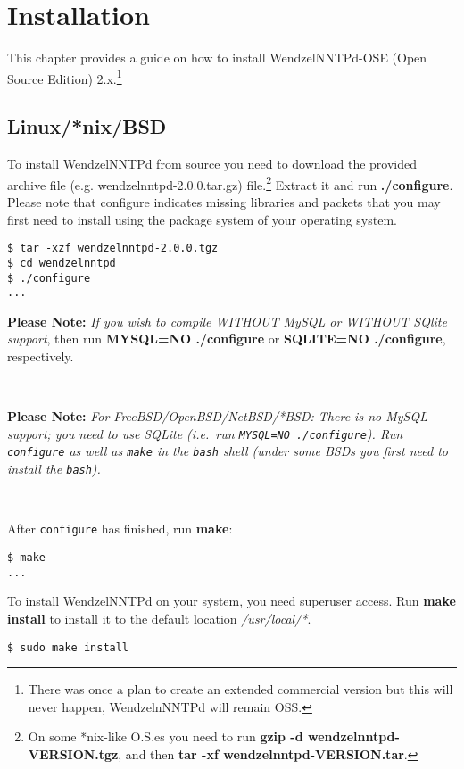 \chapter{Installation}

This chapter provides a guide on how to install WendzelNNTPd-OSE (Open Source Edition) 2.x.\footnote{There was once a plan to create an extended commercial version but this will never happen, WendzelnNNTPd will remain OSS.}

\section{Linux/*nix/BSD}

To install WendzelNNTPd from source you need to download the provided archive file (e.g. wendzelnntpd-2.0.0.tar.gz) file.\footnote{On some *nix-like O.S.es you need to run {\bf gzip -d wendzelnntpd-VERSION.tgz}, and then {\bf tar -xf wendzelnntpd-VERSION.tar}.} Extract it and run {\bf ./configure}. Please note that configure indicates missing libraries and packets that you may first need to install using the package system of your operating system.

\begin{verbatim}
$ tar -xzf wendzelnntpd-2.0.0.tgz
$ cd wendzelnntpd
$ ./configure
...
\end{verbatim}

{\bf Please Note:} {\it If you wish to compile WITHOUT MySQL or WITHOUT SQlite support}, then run {\bf MYSQL=NO ./configure} or {\bf SQLITE=NO ./configure}, respectively.

~

{\bf Please Note:} {\it For FreeBSD/OpenBSD/NetBSD/*BSD: There is no MySQL support; you need to use SQLite (i.e.\ run \texttt{MYSQL=NO ./configure}). Run \texttt{configure} as well as \texttt{make} in the \texttt{bash} shell (under some BSDs you first need to install the \texttt{bash}).}

~

After \texttt{configure} has finished, run {\bf make}:

\begin{verbatim}
$ make
...
\end{verbatim}

To install WendzelNNTPd on your system, you need superuser access. Run {\bf make install} to install it to the default location {\it /usr/local/*}.

\begin{verbatim}
$ sudo make install
\end{verbatim}

